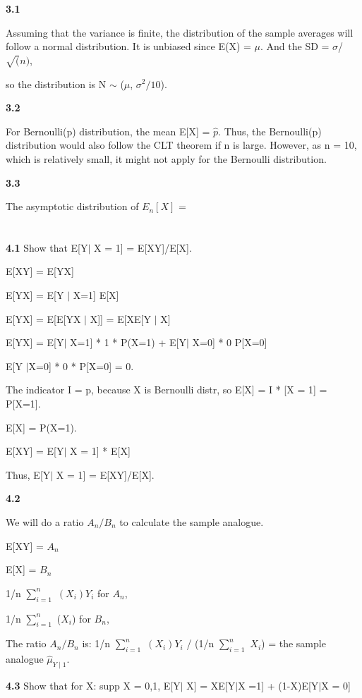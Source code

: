 \textbf{3.1}

Assuming that the variance is finite, the distribution of the sample averages will follow a normal distribution. It is unbiased since E(X) = $\mu$. And the SD = $\sigma$/$\sqrt(n)$,

so the distribution is N $\sim$ ($\mu$, $\sigma^2/10$).

\textbf{3.2}

 For Bernoulli(p) distribution, the mean E[X] = $\hat{p}$. Thus, the Bernoulli(p) distribution would also follow the CLT theorem if n is large. However, as n = 10, which is relatively small, it might not apply for the Bernoulli distribution.

\textbf{3.3}

The asymptotic distribution of $E_{n}[X]$ = 
\section{}

\textbf{4.1} Show that E[Y$\mid$ X = 1] = E[XY]/E[X].

E[XY] = E[YX]

E[YX] = E[Y $\mid$ X=1] E[X]

E[YX] = E[E[YX $\mid$ X]]  = E[XE[Y $\mid$ X]

E[YX] = E[Y$\mid$ X=1] * 1 * P(X=1) + E[Y$\mid$ X=0] * 0 P[X=0]

E[Y $\mid$X=0] * 0 * P[X=0] = 0.

The indicator I = p, because X is Bernoulli distr, so E[X] = I * [X = 1] = P[X=1].

E[X] = P(X=1).

E[XY] = E[Y$\mid$ X = 1] * E[X]

Thus, E[Y$\mid$ X = 1] = E[XY]/E[X].

\textbf{4.2}

We will do a ratio $A_{n} / B_{n}$ to calculate the sample analogue.

E[XY] = $A_{n}$

E[X] = $B_{n}$

1/n $\sum^n_{i=1}$ $(X_{i})Y_{i}$ for $A_{n}$,

1/n $\sum^n_{i=1}$ ($X_{i}$) for $B_n$, 

The ratio $A_{n}/B_{n}$ is: 
1/n $\sum^n_{i=1}$ $(X_{i})Y_{i}$ / (1/n $\sum^n_{i=1}$ $X_{i}$) = the sample analogue $\hat{\mu}_{Y\mid 1}$.


\textbf{4.3} Show that for X: supp X = {0,1}, E[Y$\mid$ X] = XE[Y$\mid$X =1] + (1-X)E[Y$\mid$X = 0]  

